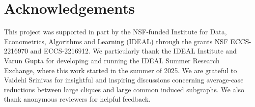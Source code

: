 \documentclass[11pt]{article}
\theoremstyle{plain}
\theoremstyle{definition}
\theoremstyle{remark}
\begin{document}
\section*{Acknowledgements}

This project was supported in part by the NSF-funded Institute for Data, Econometrics, Algorithms and Learning (IDEAL) through the grants NSF ECCS-2216970 and ECCS-2216912. We particularly thank the IDEAL Institute and Varun Gupta for developing and running the IDEAL Summer Research Exchange, where this work started in the summer of 2025. 
We are grateful to Vaidehi Srinivas for insightful and inspiring discussions concerning average-case reductions between large cliques and large common induced subgraphs.  
We also thank anonymous reviewers for helpful feedback.

\printbibliography
\end{document}
